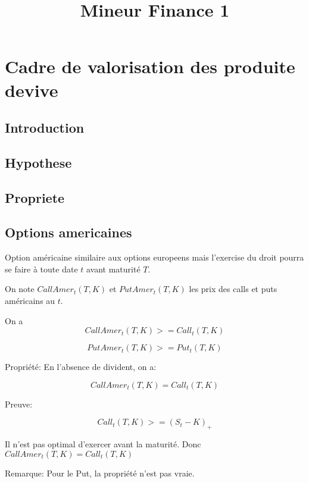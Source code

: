 \documentclass{article}
\title{Mineur Finance 1}
\begin{document}
\maketitle

\tableofcontents
\pagebreak

\section{Cadre de valorisation des produite devive}
\subsection{Introduction}
\subsection{Hypothese}
\subsection{Propriete}
\subsection{Options americaines}
Option am\'ericaine similaire aux options europeens mais l'exercise du droit pourra se faire \`a toute date $t$ avant maturit\'e $T$.

On note $CallAmer_t(T, K)$ et $PutAmer_t(T, K)$ les prix des calls et puts am\'ericains au $t$.

On a 
\begin{equation}
CallAmer_t(T,K) >= Call_t(T, K)
\end{equation}

\begin{equation}
PutAmer_t(T, K) >= Put_t(T, K)
\end{equation}

Propri\'et\'e:
En l'absence de divident, on a:

\begin{equation}
CallAmer_t(T, K) = Call_t(T, K)
\end{equation}

Preuve:

\begin{equation}
Call_t(T, K) >= (S_t- K)_+
\end{equation}

Il n'est pas optimal d'exercer avant la maturit\'e. Donc $CallAmer_t(T, K) = Call_t(T, K)$

Remarque: Pour le Put, la propri\'et\'e n'est pas vraie.
\end{document}
